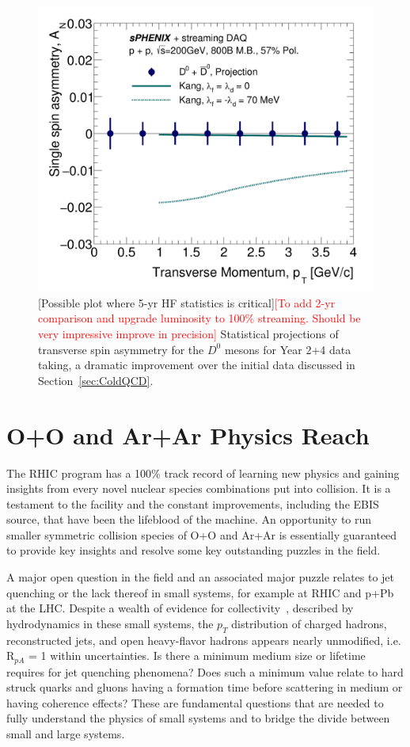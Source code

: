 \begin{figure}[h]
\begin{center}
\includegraphics[width=.49\linewidth]{figs/RAA_DB_theory_root_AN_D0D0bar.pdf}
\caption{[Possible plot where  5-yr HF statistics is critical]{\textcolor{red}{[To add 2-yr comparison and upgrade luminosity to 100\% streaming. Should be very impressive improve in precision]}} Statistical projections of
  transverse spin asymmetry for the $D^0$ mesons for Year
  2+4 data taking, a dramatic improvement over the initial data discussed in Section~\ref{sec:ColdQCD}. }
\label{fig:AN-D0}
\end{center}
\end{figure}




\FloatBarrier

\section{O+O and Ar+Ar Physics Reach}

The RHIC program has a 100\% track record of learning new physics and gaining insights from every novel nuclear species combinations put into collision.    It is a testament to the facility and the constant improvements, including the EBIS source, that have been the lifeblood of the machine.    An opportunity to run smaller symmetric collision species of O+O and Ar+Ar is essentially guaranteed to provide key insights and resolve some key outstanding puzzles in the field.  

A major open question in the field and an associated major puzzle relates to jet quenching or the lack thereof in small systems, for example \pau at RHIC and p+Pb at the LHC.    Despite a wealth of evidence for collectivity~\cite{Nagle:2018nvi}, described by hydrodynamics in these small systems, the $p_{T}$ distribution of charged hadrons, reconstructed jets, and open heavy-flavor hadrons appears nearly unmodified, i.e. R$_{pA}$ = 1 within uncertainties.    Is there a minimum medium size or lifetime requires for jet quenching phenomena?   Does such a minimum value relate to hard struck quarks and gluons having a formation time before scattering in medium or having coherence effects?   These are fundamental questions that are needed to fully understand the physics of small systems and to bridge the divide between small and large systems.    

